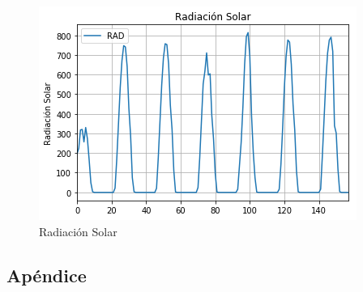 \documentclass[12pt,a4paper]{article}
\begin{document}
\begin{figure}[H]
  \centering
  \includegraphics[scale=0.5]{rad_sol.png}
  \caption{Radiación Solar}
  \label{fig:rad_sol}
\end{figure}


\subsection{Apéndice}
\end{document}
